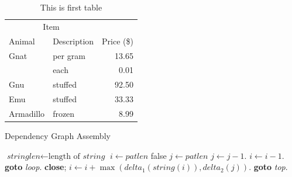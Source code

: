 \begin{table}[h]
  \centering
  \caption{This is first table}
  \begin{tabular}{@{}llr@{}} \toprule
      \multicolumn{2}{c}{Item} \\ \cmidrule(r){1-2}
      Animal & Description & Price (\$)\\ \midrule
      Gnat & per gram & 13.65 \\
      & each & 0.01 \\
      Gnu & stuffed & 92.50 \\
      Emu & stuffed & 33.33 \\
      Armadillo & frozen & 8.99 \\ \bottomrule
  \end{tabular}        
\end{table}

\begin{algorithm}
  \caption{Dependency Graph Assembly}\label{algo:AKP13_command_dependency_graph_assembly}
  \begin{algorithmic}[1]
      \State $\textit{stringlen} \gets \text{length of }\textit{string}$
      \State $i \gets \textit{patlen}$
       \Return false
      \EndIf
      \State $j \gets \textit{patlen}$
      \State $j \gets j-1$.
      \State $i \gets i-1$.
      \State \textbf{goto} \emph{loop}.
      \State \textbf{close};
      \EndIf
      \State $i \gets i+\max(\textit{delta}_1(\textit{string}(i)),\textit{delta}_2(j))$.
      \State \textbf{goto} \emph{top}.
      \EndProcedure
  \end{algorithmic}
\end{algorithm}



